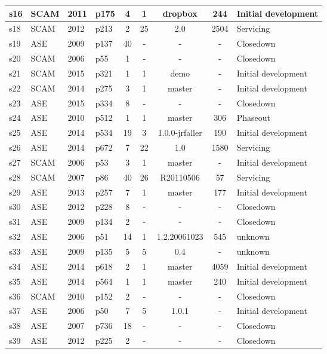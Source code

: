 \begin{longtable}{| l | l | l | l | c | c | c | c | l |}
    \hline
s16 & SCAM & 2011 & p175 & 4 & 1 & dropbox & 244 & Initial development \\
    \hline
s18 & SCAM & 2012 & p213 & 2 & 25 & 2.0 & 2504 & Servicing \\
    \hline
s19 & ASE & 2009 & p137 & 40 & - & - & - & Closedown \\
    \hline
s20 & SCAM & 2006 & p55 & 1 & - & - & - & Closedown \\
    \hline
s21 & SCAM & 2015 & p321 & 1 & 1 & demo & - & Initial development \\
    \hline
s22 & SCAM & 2014 & p275 & 3 & 1 & master & - & Initial development \\
    \hline
s23 & ASE & 2015 & p334 & 8 & - & - & - & Closedown \\
    \hline
s24 & ASE & 2010 & p512 & 1 & 1 & master & 306 & Phaseout \\
    \hline
s25 & ASE & 2014 & p534 & 19 & 3 & 1.0.0-jrfaller & 190 & Initial development \\
    \hline
s26 & ASE & 2014 & p672 & 7 & 22 & 1.0 & 1580 & Servicing \\
    \hline
s27 & SCAM & 2006 & p53 & 3 & 1 & master & - & Initial development \\
    \hline
s28 & SCAM & 2007 & p86 & 40 & 26 & R20110506 & 57 & Servicing \\
    \hline
s29 & ASE & 2013 & p257 & 7 & 1 & master & 177 & Initial development \\
    \hline
s30 & ASE & 2012 & p228 & 8 & - & - & - & Closedown \\
    \hline
s31 & ASE & 2009 & p134 & 2 & - & - & - & Closedown \\
    \hline
s32 & ASE & 2006 & p51 & 14 & 1 & 1.2.20061023 & 545 & unknown \\
    \hline
s33 & ASE & 2009 & p135 & 5 & 5 & 0.4 & - & unknown \\
    \hline
s34 & ASE & 2014 & p618 & 2 & 1 & master & 4059 & Initial development \\
    \hline
s35 & ASE & 2014 & p564 & 1 & 1 & master & 240 & Initial development \\
    \hline
s36 & SCAM & 2010 & p152 & 2 & - & - & - & Closedown \\
    \hline
s37 & ASE & 2006 & p50 & 7 & 5 & 1.0.1 & - & Initial development \\
    \hline
s38 & ASE & 2007 & p736 & 18 & - & - & - & Closedown \\
    \hline
s39 & ASE & 2012 & p225 & 2 & - & - & - & Closedown \\

\end{longtable}
